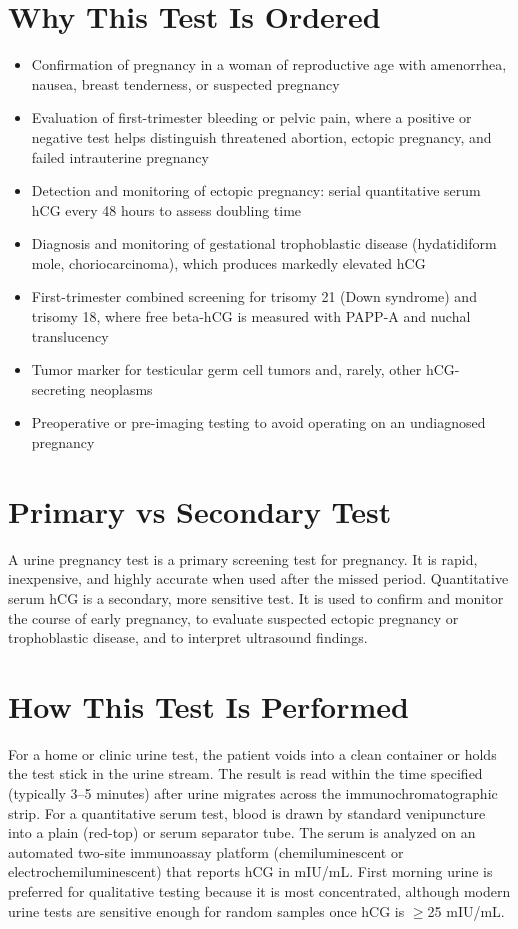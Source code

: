 \section*{Why This Test Is Ordered}
\begin{itemize}
  \item Confirmation of pregnancy in a woman of reproductive age with amenorrhea, nausea, breast tenderness, or suspected pregnancy
  \item Evaluation of first-trimester bleeding or pelvic pain, where a positive or negative test helps distinguish threatened abortion, ectopic pregnancy, and failed intrauterine pregnancy
  \item Detection and monitoring of ectopic pregnancy: serial quantitative serum hCG every 48 hours to assess doubling time \cite{barnhart2009ectopic}
  \item Diagnosis and monitoring of gestational trophoblastic disease (hydatidiform mole, choriocarcinoma), which produces markedly elevated hCG
  \item First-trimester combined screening for trisomy 21 (Down syndrome) and trisomy 18, where free beta-hCG is measured with PAPP-A and nuchal translucency
  \item Tumor marker for testicular germ cell tumors and, rarely, other hCG-secreting neoplasms
  \item Preoperative or pre-imaging testing to avoid operating on an undiagnosed pregnancy
\end{itemize}
\section*{Primary vs Secondary Test}
A urine pregnancy test is a primary screening test for pregnancy. It is rapid, inexpensive, and highly accurate when used after the missed period. Quantitative serum hCG is a secondary, more sensitive test. It is used to confirm and monitor the course of early pregnancy, to evaluate suspected ectopic pregnancy or trophoblastic disease, and to interpret ultrasound findings.
\section*{How This Test Is Performed}
For a home or clinic urine test, the patient voids into a clean container or holds the test stick in the urine stream. The result is read within the time specified (typically 3--5 minutes) after urine migrates across the immunochromatographic strip. For a quantitative serum test, blood is drawn by standard venipuncture into a plain (red-top) or serum separator tube. The serum is analyzed on an automated two-site immunoassay platform (chemiluminescent or electrochemiluminescent) that reports hCG in mIU/mL. First morning urine is preferred for qualitative testing because it is most concentrated, although modern urine tests are sensitive enough for random samples once hCG is $\geq$25 mIU/mL.
